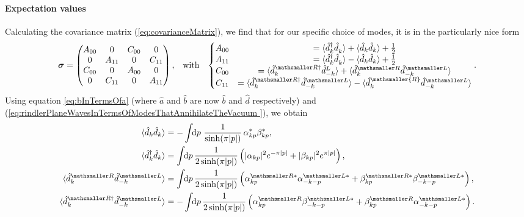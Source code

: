 \documentclass[11pt, a4paper]{article}
\newcommand{\be}{\beta}
\newcommand{\al}{\alpha}
\newcommand{\si}{{\sigma}}
\newcommand{\sfrac}[2]{{\textstyle\frac{#1}{#2}}}
\newcommand{\half}{\sfrac{1}{2}}
\newcommand{\gv}[1]{\ensuremath{\mbox{\boldmath $#1$}}}
\newcommand{\integral}{\int\!\! \mathrm{d}}
\newcommand{\ms}{\mathsmaller}
\newcommand{\nodagger}{{\phantom{\dagger}}}
\newcommand{\ddd}{\langle \hat d_k^\dagger \hat d^\nodagger_k \rangle}
\begin{document}
\paragraph{Expectation values} 
Calculating the covariance matrix (\ref{eq:covarianceMatrix}), we find that for our specific choice of modes, it is in the particularly nice form
\begin{align}
	\gv\si=
	\begin{pmatrix}
		A_{00} & 0 & C_{00} & 0\\
		0 & A_{11} & 0 & C_{11}\\
		C_{00} & 0 & A_{00} & 0\\
		0 & C_{11} & 0 & A_{11}\\
	\end{pmatrix},&&\text{with}&&
	\left\{
	\begin{matrix}
		A_{00}&=\ddd+\langle \hat d_k\hat d_k \rangle+\half\\
		A_{11}&=\ddd-\langle \hat d_k\hat d_k \rangle+\half\\
		C_{00}&=\langle \hat d_k^{\ms R\dagger} \hat d_{-k}^L \rangle+\langle \hat d_k^{\ms R} \hat d_{-k}^{\ms L} \rangle\\
		C_{11}&=\langle \hat d_k^{\ms R\dagger} \hat d_{-k}^{\ms L} \rangle-\langle \hat d_k^\ms{R} \hat d_{-k}^{\ms L} \rangle
	\end{matrix}\right. .\label{eq:sigma}
\end{align}
Using equation \ref{eq:bInTermsOfa} (where $\hat a$ and $\hat b$ are now $\hat b$ and $\hat d$ respectively) and (\ref{eq:rindlerPlaneWavesInTermsOfModesThatAnnihilateTheVacuum }), we obtain
\begin{align}
\label{eq:generalExpectationValuesRinderWavepacket}
\begin{aligned}
\langle \hat d_k \hat d_k \rangle
&=-\integral p\ \frac{1}{\sinh(\pi|p| )}\, \al_{kp}^*\be_{kp}^*,
 \\
\langle \hat d_k^\dagger \hat d_k \rangle &=\integral p\,\frac{1}{2\sinh(\pi|p| )}\left(|\al_{kp}|^2e^{-\pi|p| }+|\be_{kp}|^2e^{\pi|p| }\right),
\\
\langle \hat d_k^{\ms R} \hat d_{-k}^{\ms L} \rangle  &=\integral p\,\frac{1}{2\sinh(\pi|p| )}\left(\al^{\ms R*}_{kp}\al^{\ms L*}_{-k-p}+\be^{\ms R*}_{kp}\be^{\ms L*}_{-k-p}\right),
\\
\langle \hat d_k^{\ms R\dagger}\hat d_{-k}^{\ms L}\rangle  &=-\integral p\,\frac{1}{2\sinh(\pi|p| )}\left(\al_{kp}^{\ms R}\be_{-k-p}^{\ms L*}+\be_{kp}^{\ms R}\al_{-k-p}^{\ms L*}\right).
\end{aligned}
\end{align}
\end{document}
